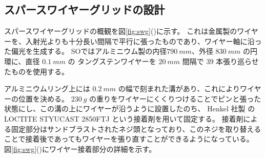 \documentclass[../../main.tex]{subfiles}
\begin{document}
\subsection{スパースワイヤーグリッドの設計}
スパースワイヤーグリッドの概観を図\ref{fig:swg}()に示す。
これは金属製のワイヤーを、入射光よりも十分長い間隔で平行に張ったものであり、ワイヤー軸に沿った偏光を生成する。
SOではアルミニウム製の内径$\SI{790}{mm}$、外径 $\SI{830}{mm}$ の円環に、直径 $\SI{0.1}{mm}$ の
タングステンワイヤーを $\SI{20}{mm}$ 間隔で $39$ 本張り巡らせたものを使用する\cite{swg:murata}。

アルミニウムリング上には $\SI{0.2}{mm}$ の幅で刻まれた溝があり、これによりワイヤーの位置を決める。
$\SI{230}{g}$ の重りをワイヤーにくくりつけることでピンと張った状態にし、この溝の上にワイヤーが沿うように設置したのち、
Henkel 社製 の LOCTITE STYUCAST 2850FTJ という接着剤を用いて固定する。
接着剤による固定部分はサンドブラストされたネジ頭となっており、このネジを取り替えることで接着後であってもワイヤーを張り直すことができるようになっている。
図\ref{fig:swg}()にワイヤー接着部分の詳細を示す。
\end{document}
